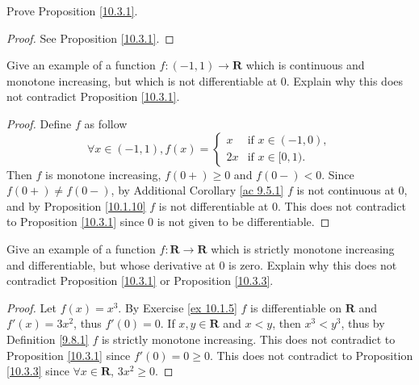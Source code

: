 \exercisesection

\begin{exercise}\label{ex 10.3.1}
    Prove Proposition \ref{10.3.1}.
\end{exercise}

\begin{proof}
    See Proposition \ref{10.3.1}.
\end{proof}

\begin{exercise}\label{ex 10.3.2}
    Give an example of a function \(f : (-1, 1) \to \mathbf{R}\) which is continuous and monotone increasing, but which is not differentiable at \(0\).
    Explain why this does not contradict Proposition \ref{10.3.1}.
\end{exercise}

\begin{proof}
    Define \(f\) as follow
    \[
        \forall x \in (-1, 1), f(x) = \begin{cases}
            x  & \text{if } x \in (-1, 0), \\
            2x & \text{if } x \in [0, 1).
        \end{cases}
    \]
    Then \(f\) is monotone increasing, \(f(0+) \geq 0\) and \(f(0-) < 0\).
    Since \(f(0+) \neq f(0-)\), by Additional Corollary \ref{ac 9.5.1} \(f\) is not continuous at \(0\), and by Proposition \ref{10.1.10} \(f\) is not differentiable at \(0\).
    This does not contradict to Proposition \ref{10.3.1} since \(0\) is not given to be differentiable.
\end{proof}

\begin{exercise}\label{ex 10.3.3}
    Give an example of a function \(f : \mathbf{R} \to \mathbf{R}\) which is strictly monotone increasing and differentiable, but whose derivative at \(0\) is zero.
    Explain why this does not contradict Proposition \ref{10.3.1} or Proposition \ref{10.3.3}.
\end{exercise}

\begin{proof}
    Let \(f(x) = x^3\).
    By Exercise \ref{ex 10.1.5} \(f\) is differentiable on \(\mathbf{R}\) and \(f'(x) = 3x^2\), thus \(f'(0) = 0\).
    If \(x, y \in \mathbf{R}\) and \(x < y\), then \(x^3 < y^3\), thus by Definition \ref{9.8.1} \(f\) is strictly monotone increasing.
    This does not contradict to Proposition \ref{10.3.1} since \(f'(0) = 0 \geq 0\).
    This does not contradict to Proposition \ref{10.3.3} since \(\forall x \in \mathbf{R}\), \(3x^2 \geq 0\).
\end{proof}

